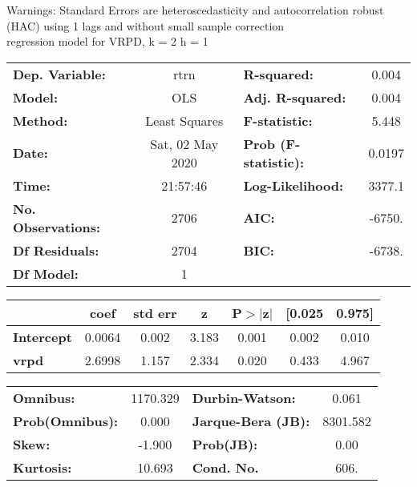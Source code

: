 Warnings: \newline
 [1] Standard Errors are heteroscedasticity and autocorrelation robust (HAC) using 1 lags and without small sample correction\\ 

regression model for VRPD, k = 2 h = 1\begin{center}
\begin{tabular}{lclc}
\toprule
\textbf{Dep. Variable:}    &       rtrn       & \textbf{  R-squared:         } &     0.004   \\
\textbf{Model:}            &       OLS        & \textbf{  Adj. R-squared:    } &     0.004   \\
\textbf{Method:}           &  Least Squares   & \textbf{  F-statistic:       } &     5.448   \\
\textbf{Date:}             & Sat, 02 May 2020 & \textbf{  Prob (F-statistic):} &   0.0197    \\
\textbf{Time:}             &     21:57:46     & \textbf{  Log-Likelihood:    } &    3377.1   \\
\textbf{No. Observations:} &        2706      & \textbf{  AIC:               } &    -6750.   \\
\textbf{Df Residuals:}     &        2704      & \textbf{  BIC:               } &    -6738.   \\
\textbf{Df Model:}         &           1      & \textbf{                     } &             \\
\bottomrule
\end{tabular}
\begin{tabular}{lcccccc}
                   & \textbf{coef} & \textbf{std err} & \textbf{z} & \textbf{P$> |$z$|$} & \textbf{[0.025} & \textbf{0.975]}  \\
\midrule
\textbf{Intercept} &       0.0064  &        0.002     &     3.183  &         0.001        &        0.002    &        0.010     \\
\textbf{vrpd}      &       2.6998  &        1.157     &     2.334  &         0.020        &        0.433    &        4.967     \\
\bottomrule
\end{tabular}
\begin{tabular}{lclc}
\textbf{Omnibus:}       & 1170.329 & \textbf{  Durbin-Watson:     } &    0.061  \\
\textbf{Prob(Omnibus):} &   0.000  & \textbf{  Jarque-Bera (JB):  } & 8301.582  \\
\textbf{Skew:}          &  -1.900  & \textbf{  Prob(JB):          } &     0.00  \\
\textbf{Kurtosis:}      &  10.693  & \textbf{  Cond. No.          } &     606.  \\
\bottomrule
\end{tabular}
\end{center}

